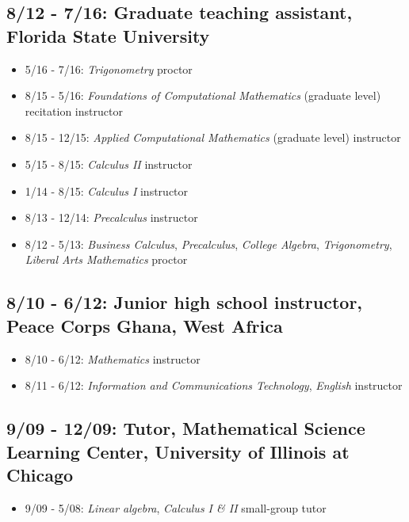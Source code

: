 \documentclass[11pt]{article}
\begin{document}
\subsection*{8/12 - 7/16: Graduate teaching assistant, Florida State University}
\label{sec:orgheadline12}
\begin{itemize}
\item 5/16 - 7/16: \emph{Trigonometry} proctor\\
\item 8/15 - 5/16: \emph{Foundations of Computational Mathematics} (graduate level) recitation instructor\\
\item 8/15 - 12/15: \emph{Applied Computational Mathematics} (graduate level) instructor\\
\item 5/15 - 8/15: \emph{Calculus II} instructor\\
\item 1/14 - 8/15: \emph{Calculus I} instructor\\
\item 8/13 - 12/14: \emph{Precalculus} instructor\\
\item 8/12 - 5/13: \emph{Business Calculus}, \emph{Precalculus}, \emph{College Algebra}, \emph{Trigonometry}, \emph{Liberal Arts Mathematics} proctor\\
\end{itemize}
\subsection*{8/10 - 6/12: Junior high school instructor, Peace Corps Ghana, West Africa}
\label{sec:orgheadline13}
\begin{itemize}
\item 8/10 - 6/12: \emph{Mathematics} instructor\\
\item 8/11 - 6/12: \emph{Information and Communications Technology}, \emph{English} instructor\\
\end{itemize}
\subsection*{9/09 - 12/09: Tutor, Mathematical Science Learning Center, University of Illinois at Chicago}
\label{sec:orgheadline14}
\begin{itemize}
\item 9/09 - 5/08: \emph{Linear algebra}, \emph{Calculus I \& II} small-group tutor\\
\end{itemize}
\end{document}

